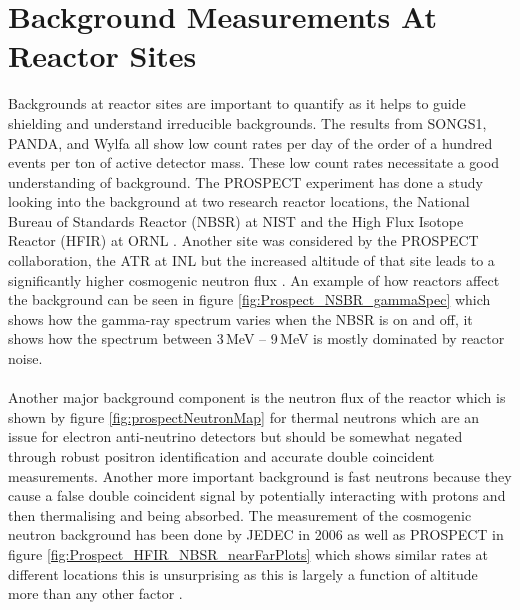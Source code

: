 \section{Background Measurements At Reactor Sites}
Backgrounds at reactor sites are important to quantify as it helps to guide shielding and understand irreducible backgrounds. The results from SONGS1, PANDA, and Wylfa all show low count rates per day of the order of a hundred events per ton of active detector mass. These low count rates necessitate a good understanding of background. The PROSPECT experiment has done a  study looking into the background at two research reactor locations, the National Bureau of Standards Reactor (NBSR) at NIST and the High Flux Isotope Reactor (HFIR) at ORNL \cite{Ashenfelter_2016}. Another site was considered by the PROSPECT collaboration, the ATR at INL but the increased altitude of that site leads to a significantly higher cosmogenic neutron flux \cite{Ashenfelter_2016}. An example of how reactors affect the background can be seen in figure \ref{fig:Prospect_NSBR_gammaSpec} which shows how the gamma-ray spectrum varies when the NBSR is on and off, it shows how the spectrum between 3\,MeV -- 9\,MeV is mostly dominated by reactor noise. 
\\\\Another major background component is the neutron flux of the reactor which is shown by figure \ref{fig:prospectNeutronMap} for thermal neutrons which are an issue for electron anti-neutrino detectors but should be somewhat negated through robust positron identification and accurate double coincident measurements. Another more important background is fast neutrons because they cause a false double coincident signal by potentially interacting with protons and then thermalising and being absorbed. The measurement of the cosmogenic neutron background has been done by JEDEC in 2006 \cite{JEDEC_2006} as well as PROSPECT in figure \ref{fig:Prospect_HFIR_NBSR_nearFarPlots} which shows similar rates at different locations this is unsurprising as this is largely a function of altitude more than any other factor \cite{Ashenfelter_2016}. 

